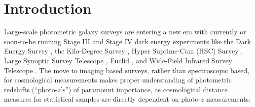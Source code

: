 \section{Introduction}
\label{sec:intro}



Large-scale photometric galaxy surveys are entering a new era with currently or soon-to-be running Stage III and Stage IV dark energy experiments like the Dark Energy Survey \citep[DES,][]{Abbott:05}, the Kilo-Degree Survey \citep[KiDS,][]{de_Jong:13}, Hyper Suprime-Cam (HSC) Survey \citep[]{Aihara:2018a,Aihara:2018b}, Large Synoptic Survey Telescope \citep[LSST,][]{Abell:09}, Euclid \citep{Laureijs:11}, and Wide-Field Infrared Survey Telescope \citep[WFIRST,][]{Green:12}.
The move to imaging based surveys, rather than spectroscopic based, for cosmological measurements makes proper understanding of photometric redshifts (``photo-$z$'s'') of paramount importance, as cosmological distance measures for statistical samples are directly dependent on photo-$z$ measurements.

